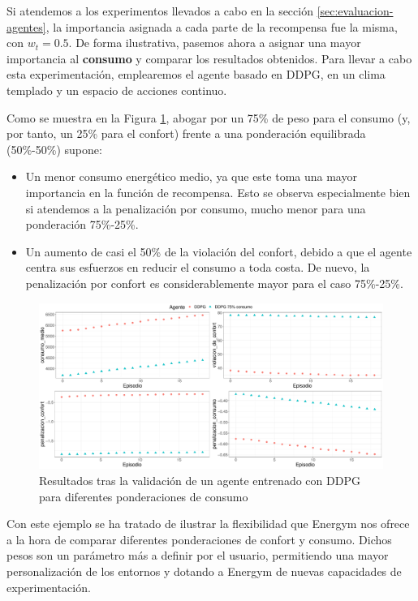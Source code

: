 Si atendemos a los experimentos llevados a cabo en la sección \ref{sec:evaluacion-agentes}, la importancia asignada a cada parte de la recompensa fue la misma, con $w_t=0.5$. De forma ilustrativa, pasemos ahora a asignar una mayor importancia al \textbf{consumo} y comparar los resultados obtenidos. Para llevar a cabo esta experimentación, emplearemos el agente basado en DDPG, en un clima templado y un espacio de acciones continuo.

Como se muestra en la Figura \ref{fig:pesos-consumo}, abogar por un 75\% de peso para el consumo (y, por tanto, un 25\% para el confort) frente a una ponderación equilibrada (50\%-50\%) supone:

\begin{itemize}
    \item Un menor consumo energético medio, ya que este toma una mayor importancia en la función de recompensa. Esto se observa especialmente bien si atendemos a la penalización por consumo, mucho menor para una ponderación 75\%-25\%.
    \item Un aumento de casi el 50\% de la violación del confort, debido a que el agente centra sus esfuerzos en reducir el consumo a toda costa. De nuevo, la penalización por confort es considerablemente mayor para el caso 75\%-25\%.
\end{itemize}

\begin{figure}
    \centering
    \includegraphics[width=\textwidth]{imagenes/energy-weights-DDPG.pdf}
    \caption{Resultados tras la validación de un agente entrenado con DDPG para diferentes ponderaciones de consumo}
    \label{fig:pesos-consumo}
\end{figure}

Con este ejemplo se ha tratado de ilustrar la flexibilidad que Energym nos ofrece a la hora de comparar diferentes ponderaciones de confort y consumo. Dichos pesos son un parámetro más a definir por el usuario, permitiendo una mayor personalización de los entornos y dotando a Energym de nuevas capacidades de experimentación. 

